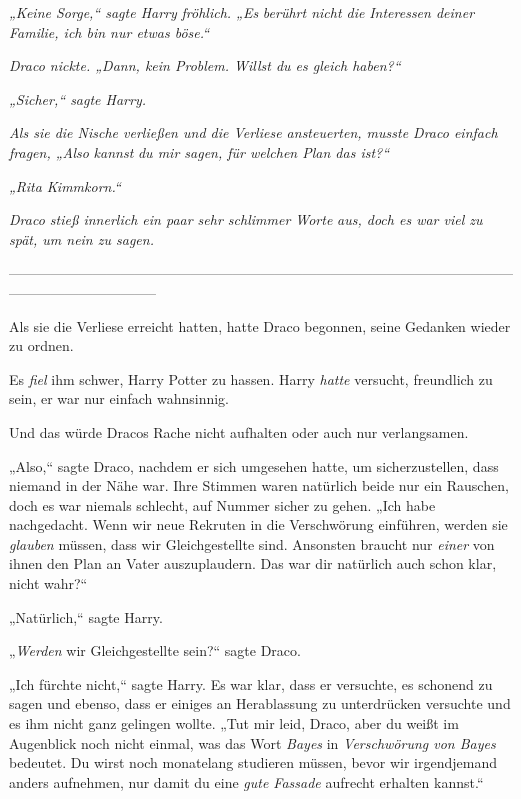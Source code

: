 {\emph{„Keine Sorge,“ sagte Harry} \emph{fröhlich. „Es} \emph{berührt nicht die} \emph{Interessen deiner Familie, ich bin nur etwas böse.“}

\emph{Draco nickte. „Dann, kein Problem. Willst du es gleich haben?“}

\emph{„Sicher,“ sagte Harry.}

\emph{Als sie die Nische verließen und die Verliese ansteuerten, musste Draco einfach fragen, „Also} \emph{\emph{kannst}} \emph{du mir sagen, für welchen Plan das ist?“}

\emph{„Rita Kimmkorn.“}

\emph{Draco stieß innerlich ein paar sehr schlimmer Worte} \emph{aus, doch es war viel zu spät, um nein zu sagen.}

--------------------------------------------------------------------------------------------------------------------------------------------

\hfill\break Als sie die Verliese erreicht hatten, hatte Draco begonnen, seine Gedanken wieder zu ordnen.

Es \emph{fiel} ihm schwer, Harry Potter zu hassen. Harry \emph{hatte} versucht, freundlich zu sein, er war nur einfach wahnsinnig.

Und das würde Dracos Rache nicht aufhalten oder auch nur verlangsamen.

„Also,“ sagte Draco, nachdem er sich umgesehen hatte, um sicherzustellen, dass niemand in der Nähe war. Ihre Stimmen waren natürlich beide nur ein Rauschen, doch es war niemals schlecht, auf Nummer sicher zu gehen. „Ich habe nachgedacht. Wenn wir neue Rekruten in die Verschwörung einführen, werden sie \emph{glauben} müssen, dass wir Gleichgestellte sind. Ansonsten braucht nur \emph{einer} von ihnen den Plan an Vater auszuplaudern. Das war dir natürlich auch schon klar, nicht wahr?“

„Natürlich,“ sagte Harry.

„\emph{Werden} wir Gleichgestellte sein?“ sagte Draco.

„Ich fürchte nicht,“ sagte Harry. Es war klar, dass er versuchte, es schonend zu sagen und ebenso, dass er einiges an Herablassung zu unterdrücken versuchte und es ihm nicht ganz gelingen wollte. „Tut mir leid, Draco, aber du weißt im Augenblick noch nicht einmal, was das Wort \emph{Bayes} in \emph{Verschwörung von Bayes} bedeutet. Du wirst noch monatelang studieren müssen, bevor wir irgendjemand anders aufnehmen, nur damit du eine \emph{gute Fassade} aufrecht erhalten kannst.“

}
